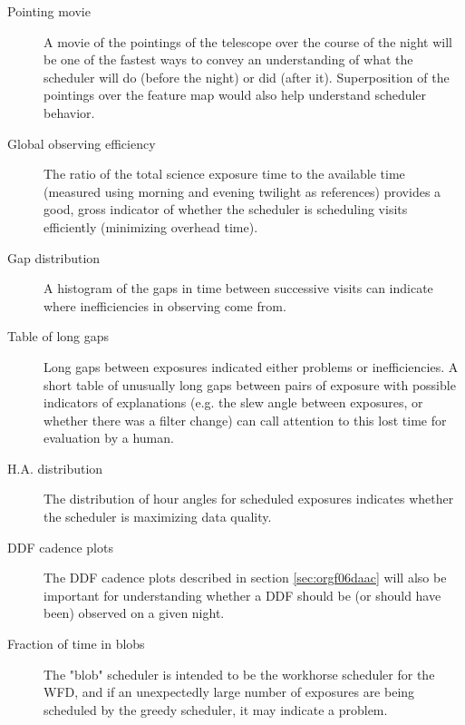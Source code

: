 \begin{description}
\item[{Pointing movie}] A movie of the pointings of the telescope over the course of the night will be one of the fastest ways to convey an understanding of what the scheduler will do (before the night) or did (after it). Superposition of the pointings over the feature map would also help understand scheduler behavior.
\item[{Global observing efficiency}] The ratio of the total science exposure time to the available time (measured using morning and evening twilight as references) provides a good, gross indicator of whether the scheduler is scheduling visits efficiently (minimizing overhead time).
\item[{Gap distribution}] A histogram of the gaps in time between successive visits can indicate where inefficiencies in observing come from.
\item[{Table of long gaps}] Long gaps between exposures indicated either problems or inefficiencies. A short table of unusually long gaps between pairs of exposure with possible indicators of explanations (e.g. the slew angle between exposures, or whether there was a filter change) can call attention to this lost time for evaluation by a human.
\item[{H.A. distribution}] The distribution of hour angles for scheduled exposures indicates whether the scheduler is maximizing data quality.
\item[{DDF cadence plots}] The DDF cadence plots described in section \ref{sec:orgf06daac} will also be important for understanding whether a DDF should be (or should have been) observed on a given night.
\item[{Fraction of time in blobs}] The "blob" scheduler is intended to be the workhorse scheduler for the WFD, and if an unexpectedly large number of exposures are being scheduled by the greedy scheduler, it may indicate a problem.
\end{description}

